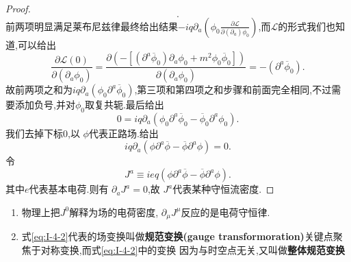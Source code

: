 \documentclass[../main.tex]{subfiles}
\begin{document}
\begin{proof}
\[.\] 
前两项明显满足莱布尼兹律最终给出结果$-iq \partial_a (\phi_0 \frac{\partial \mathscr{L}}{\partial (\partial_a)\phi_0} )$,而$\mathscr{L}$的形式我们也知道,可以给出\[
\frac{\partial \mathscr{L}(0)}{\partial (\partial_a\phi_0)}  =   \frac{\partial (-[(\partial^a \overline{\phi}_0)\partial_a \phi_0 + m^2\phi_0 \overline{\phi}_0])}{\partial (\partial_a\phi_0)} = -(\partial^a \overline{\phi}_0)
.\] 
故前两项之和为$iq\partial_a(\phi_0 \partial^a \overline{\phi}_0)$,第三项和第四项之和步骤和前面完全相同,不过需要添加负号,并对$\phi_0$取复共轭.最后给出\[
0 = iq\partial_a(\phi_0 \partial^a \overline{\phi}_0 - \overline{\phi}_0 \partial^a \phi_0)
.\] 
我们去掉下标$0$,以 $\phi$代表正路场.给出 \[
iq\partial_a(\phi \partial^a \overline{\phi} - \overline{\phi} \partial^a \phi) = 0
.\] 
令 \[
J^a \equiv ieq (\phi \partial^a \overline{\phi} - \overline{\phi} \partial^a \phi)
.\] 
其中$e$代表基本电荷.则有 $\partial_a J^a = 0$,故 $J^a$代表某种守恒流密度.
 \end{proof}
 \begin{remark}
\begin{enumerate}
  \item 物理上把$J^0$解释为场的电荷密度, $\partial_\mu J^\mu$反应的是电荷守恒律.
  \item 式\ref{eq:I-4-2}代表的场变换叫做\textbf{规范变换(gauge transformoration)}关键点聚焦于对称变换,而式\ref{eq:I-4-2}中的变换
    因为与时空点无关,又叫做\textbf{整体规范变换}
\end{enumerate} 
 \end{remark}
\end{document}

